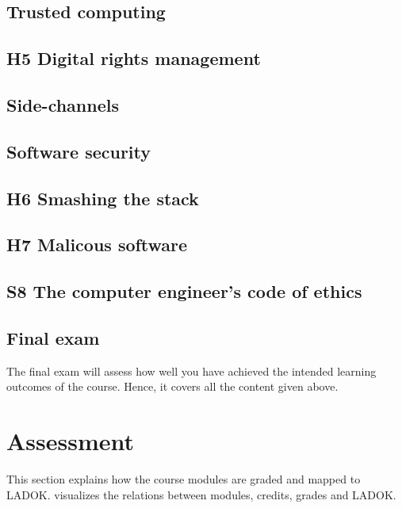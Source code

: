 \subsection{Trusted computing}


\subsection{H5 Digital rights management}


\subsection{Side-channels}


\subsection{Software security}


\subsection{H6 Smashing the stack}


\subsection{H7 Malicous software}


\subsection{S8 The computer engineer's code of ethics}


\subsection{Final exam}

The final exam will assess how well you have achieved the intended learning 
outcomes of the course.
Hence, it covers all the content given above.


\section{Assessment}
\label{Assessment}

This section explains how the course modules are graded and mapped to LADOK\@.
 visualizes the relations between modules, credits, grades and 
LADOK\@.

